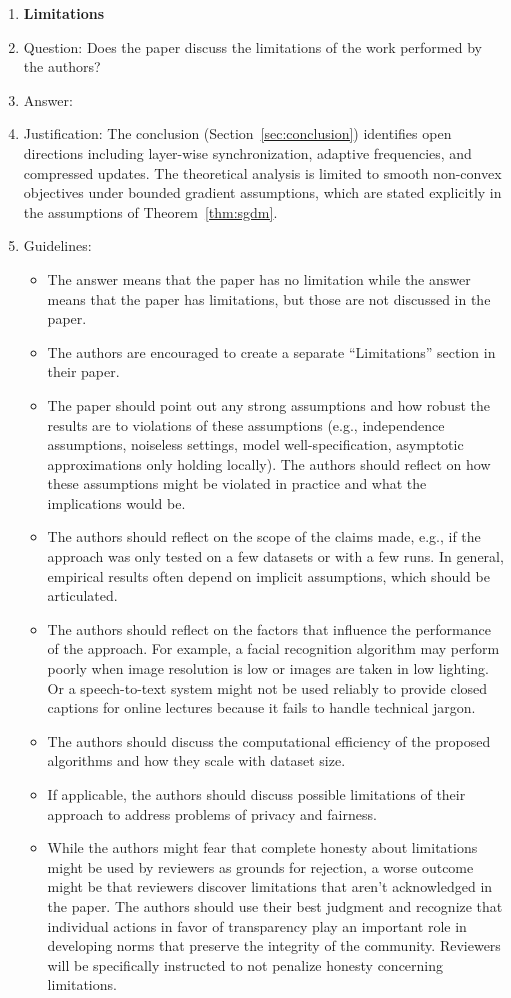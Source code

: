 \documentclass{article}
\begin{document}
\begin{enumerate}
\item {\bf Limitations}
    \item[] Question: Does the paper discuss the limitations of the work performed by the authors?
    \item[] Answer: \answerYes{}
    \item[] Justification: The conclusion (Section~\ref{sec:conclusion}) identifies open directions including layer-wise synchronization, adaptive frequencies, and compressed updates. The theoretical analysis is limited to smooth non-convex objectives under bounded gradient assumptions, which are stated explicitly in the assumptions of Theorem~\ref{thm:sgdm}.
    \item[] Guidelines:
    \begin{itemize}
        \item The answer \answerNA{} means that the paper has no limitation while the answer \answerNo{} means that the paper has limitations, but those are not discussed in the paper. 
        \item The authors are encouraged to create a separate ``Limitations'' section in their paper.
        \item The paper should point out any strong assumptions and how robust the results are to violations of these assumptions (e.g., independence assumptions, noiseless settings, model well-specification, asymptotic approximations only holding locally). The authors should reflect on how these assumptions might be violated in practice and what the implications would be.
        \item The authors should reflect on the scope of the claims made, e.g., if the approach was only tested on a few datasets or with a few runs. In general, empirical results often depend on implicit assumptions, which should be articulated.
        \item The authors should reflect on the factors that influence the performance of the approach. For example, a facial recognition algorithm may perform poorly when image resolution is low or images are taken in low lighting. Or a speech-to-text system might not be used reliably to provide closed captions for online lectures because it fails to handle technical jargon.
        \item The authors should discuss the computational efficiency of the proposed algorithms and how they scale with dataset size.
        \item If applicable, the authors should discuss possible limitations of their approach to address problems of privacy and fairness.
        \item While the authors might fear that complete honesty about limitations might be used by reviewers as grounds for rejection, a worse outcome might be that reviewers discover limitations that aren't acknowledged in the paper. The authors should use their best judgment and recognize that individual actions in favor of transparency play an important role in developing norms that preserve the integrity of the community. Reviewers will be specifically instructed to not penalize honesty concerning limitations.
    \end{itemize}


\end{enumerate}
\end{document}

